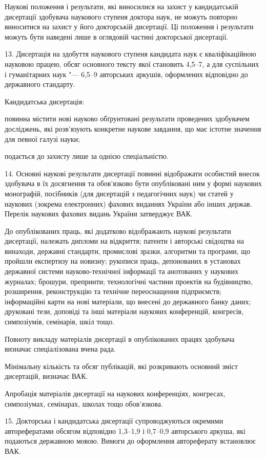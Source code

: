 \documentclass[
]{mon2017dev-aref}[2019/11/16]
\theoremstyle{plain}
\theoremstyle{definition}
\theoremstyle{remark}
\begin{document}
Наукові положення і результати, які виносилися на захист у
кандидатській дисертації здобувача наукового ступеня доктора наук,
не можуть повторно виноситися на захист у його докторській
дисертації. Ці положення і результати можуть бути наведені лише в
оглядовій частині докторської дисертації.

13. Дисертація на здобуття наукового ступеня кандидата наук є
кваліфікаційною науковою працею, обсяг основного тексту якої
становить 4,5--7, а для суспільних і гуманітарних наук "--- 6,5--9
авторських аркушів, оформлених відповідно до державного стандарту.

Кандидатська дисертація:

повинна містити нові науково обґрунтовані результати проведених
здобувачем досліджень, які розв'язують конкретне наукове завдання,
що має істотне значення для певної галузі науки;

подається до захисту лише за однією спеціальністю.

14. Основні наукові результати дисертації повинні відображати
особистий внесок здобувача в їх досягнення та обов'язково бути
опубліковані ним у формі наукових монографій, посібників (для
дисертацій з педагогічних наук) чи статей у наукових (зокрема
електронних) фахових виданнях України або інших держав. Перелік
наукових фахових видань України затверджує ВАК.

До опублікованих праць, які додатково відображають наукові
результати дисертації, належать дипломи на відкриття; патенти і
авторські свідоцтва на винаходи, державні стандарти, промислові
зразки, алгоритми та програми, що пройшли експертизу на новизну;
рукописи праць, депонованих в установах державної системи
науково-технічної інформації та анотованих у наукових журналах;
брошури, препринти; технологічні частини проектів на будівництво,
розширення, реконструкцію та технічне переоснащення підприємств;
інформаційні карти на нові матеріали, що внесені до державного
банку даних; друковані тези, доповіді та інші матеріали наукових
конференцій, конгресів, симпозіумів, семінарів, шкіл тощо.

Повноту викладу матеріалів дисертації в опублікованих працях
здобувача визначає спеціалізована вчена рада.

Мінімальну кількість та обсяг публікацій, які розкривають основний
зміст дисертацій, визначає ВАК.

Апробація матеріалів дисертації на наукових конференціях,
конгресах, симпозіумах, семінарах, школах тощо обов'язкова.

15. Докторська і кандидатська дисертації супроводжуються окремими
авторефератами обсягом відповідно 1,3--1,9 і 0,7--0,9 авторського
аркуша, які подаються державною мовою. Вимоги до оформлення
автореферату встановлює ВАК.
\end{document}
